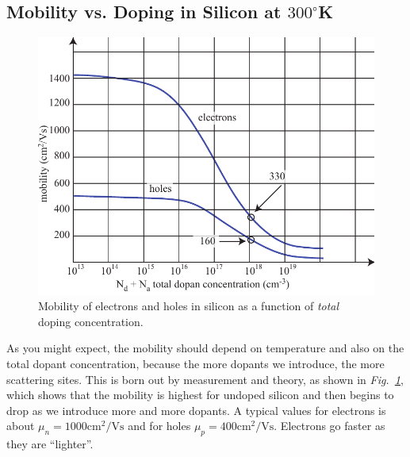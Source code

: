 \subsection{Mobility vs. Doping in Silicon at \texorpdfstring{$300^\circ$}{300K}K}
\begin{figure}[tb]
\centering
\includegraphics[width=\columnwidth]{mobility}
\caption{Mobility of electrons and holes in silicon as a function of \emph{total} doping concentration. }
\label{fig:mobility}
\end{figure}
As you might expect, the mobility should depend on temperature and also on the total dopant concentration, because the more dopants we introduce, the more scattering sites.  This is born out by measurement and theory, as shown in \emph{Fig.~\ref{fig:mobility}}, which shows that the mobility is highest for undoped silicon and then begins to drop as we introduce more and more dopants.  A typical values for electrons is about ${\mu _n} = 1000 \mathrm{cm^2}/\mathrm{V s}$ and for holes ${\mu _p} = 400 \mathrm{cm^2}/\mathrm{V s}$.  Electrons go faster as they are “lighter”.
\newpage
